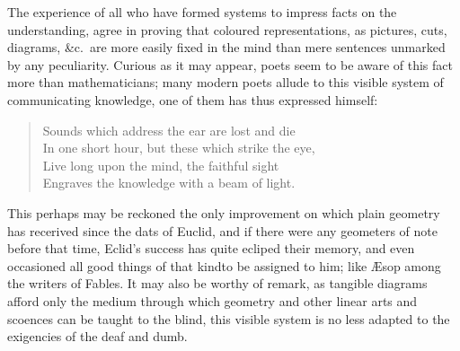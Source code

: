     The experience of all who have formed systems to impress facts on the understanding, agree in proving that coloured representations, as pictures, cuts, diagrams, \&c.~are more easily fixed in the mind than mere sentences unmarked by any peculiarity. Curious as it may appear, poets seem to be aware of this fact more than mathematicians; many modern poets allude to this visible system of communicating knowledge, one of them has thus expressed himself: 
    \begin{quotation}
        Sounds which address the ear are lost and die\\
        In one short hour, but these which strike the eye,\\
        Live long upon the mind, the faithful sight\\
        Engraves the knowledge with a beam of light.
    \end{quotation}
    This perhaps may be reckoned the only improvement on which plain geometry has recerived since the dats of Euclid, and if there were any geometers of note before that time, Eclid's success has quite ecliped their memory, and even occasioned all good things of that kindto be assigned to him; like \AE sop among the writers of Fables. It may also be worthy of remark, as tangible diagrams afford only the medium through which geometry and other linear arts and scoences can be taught to the blind, this visible system is no less adapted to the exigencies of the deaf and dumb. 

